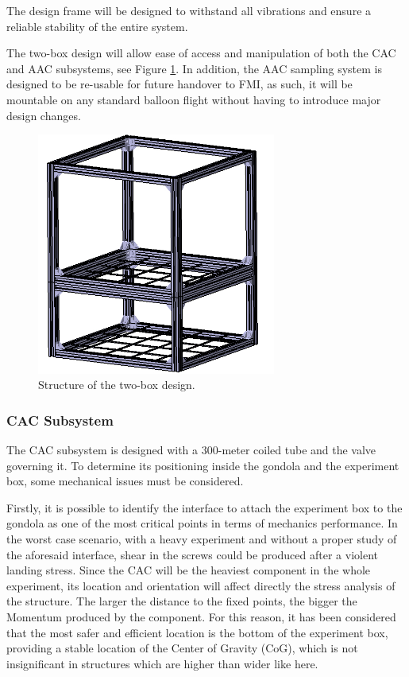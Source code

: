 The design frame will be designed to withstand all vibrations and ensure a reliable stability of the entire system. 

The two-box design will allow ease of access and manipulation of both the CAC and AAC subsystems, see Figure \ref{strucutre}. In addition, the AAC sampling system is designed to be re-usable for future handover to FMI, as such, it will be mountable on any standard balloon flight without having to introduce major design changes.

\begin{figure}[!ht]
    \centering
    \includegraphics[width=0.7\textwidth]{4-experiment-design/img/frame_structure.jpg}
    \caption{Structure of the two-box design.}
    \label{strucutre}
\end{figure}

\subsubsection{CAC Subsystem}

The CAC subsystem is designed with a 300-meter coiled tube and the valve governing it. To determine its positioning inside the gondola and the experiment box, some mechanical issues must be considered.

\smallskip
Firstly, it is possible to identify the interface to attach the experiment box to the gondola as one of the most critical points in terms of mechanics performance. In the worst case scenario, with a heavy experiment and without a proper study of the aforesaid interface, shear in the screws could be produced after a violent landing stress. Since the CAC will be the heaviest component in the whole experiment, its location and orientation will affect directly the stress analysis of the structure. The larger the distance to the fixed points, the bigger the Momentum produced by the component. For this reason, it has been considered that the most safer and efficient location is the bottom of the experiment box, providing a stable location of the Center of Gravity (CoG), which is not insignificant in structures which are higher than wider like here.

